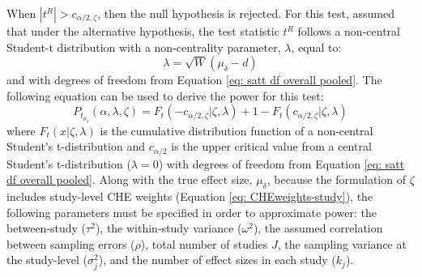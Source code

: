 When $|t^R| > c_{\alpha/2, \zeta}$, then the null hypothesis is rejected. For this test, \textcite{vembye2023} assumed that under the alternative hypothesis, the test statistic $t^R$ follows a non-central Student-t distribution with a non-centrality parameter, $\lambda$, equal to:
\begin{equation}
    \lambda =\sqrt{W}(\mu_{\delta} -d)
\end{equation}
and with degrees of freedom from Equation \ref{eq: satt df overall pooled}. The following equation can be used to derive the power for this test:
\begin{equation}
    P_{t_{\mu_{\delta}}}(\alpha, \lambda, \zeta) = F_t(-c_{\alpha/2, \zeta}|\zeta,\lambda) + 1 - F_t(c_{\alpha/2, \zeta}|\zeta,\lambda)
\end{equation}
where $F_t(x|\zeta,\lambda)$ is the cumulative distribution function of a non-central Student's t-distribution and $c_{\alpha/2}$ is the upper critical value from a central Student's t-distribution ($\lambda = 0$) with degrees of freedom from Equation \ref{eq: satt df overall pooled}. Along with the true effect size, $\mu_{\delta}$, because the formulation of $\zeta$ includes study-level CHE weights (Equation \ref{eq: CHEweights-study}), the following parameters must be specified in order to approximate power: the between-study ($\tau^2$), the within-study variance ($\omega^2$), the assumed correlation between sampling errors ($\rho$), total number of studies $J$, the sampling variance at the study-level ($\sigma^2_j$), and the number of effect sizes in each study ($k_j$).


